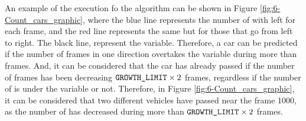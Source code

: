 An example of the execution fo the algorithm can be shown in Figure \ref{fig:6-Count_cars_graphic}, where the blue line represents the number of  with left  for each frame, and the red line represents the same but for those that go from left to right. The black line, represent the  variable. Therefore, a car can be predicted if the number of frames in one direction overtakes the  variable during more than  frames. And, it can be considered that the car has already passed if the number of frames has been decreasing $\mbox{\texttt{GROWTH\_LIMIT}} \times 2 $ frames, regardless if the number of  is under the  variable or not. Therefore, in Figure \ref{fig:6-Count_cars_graphic}, it can be considered that two different vehicles have passed near the frame 1000, as the number of  has decreased during more than $\mbox{\texttt{GROWTH\_LIMIT}} \times 2 $ frames.

